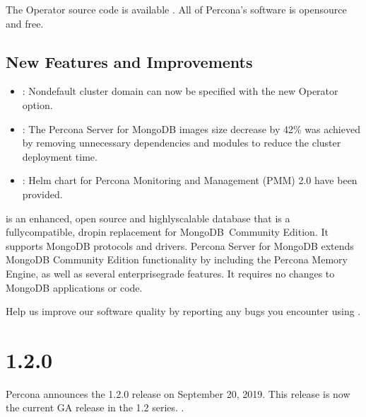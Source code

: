 \documentclass[letterpaper,10pt,english]{sphinxmanual}
\begin{document}
The Operator source code is available .
All of Percona’s software is open\sphinxhyphen{}source and free.


\subsection{New Features and Improvements}
\label{\detokenize{RN/Kubernetes-Operator-for-PSMONGODB-RN1.3.0:new-features-and-improvements}}\begin{itemize}
\item {} 
: Non\sphinxhyphen{}default cluster domain can now be specified with the new
 Operator option.

\item {} 
: The Percona Server for MongoDB images size decrease by 42\%
was achieved by removing unnecessary dependencies and modules to reduce the
cluster deployment time.

\item {} 
: Helm chart for Percona Monitoring and Management (PMM) 2.0
have been provided.

\end{itemize}

is an enhanced, open source and highly\sphinxhyphen{}scalable database that is a
fully\sphinxhyphen{}compatible, drop\sphinxhyphen{}in replacement for MongoDB Community Edition. It supports
MongoDB protocols and drivers. Percona Server for MongoDB extends MongoDB
Community Edition functionality by including the Percona Memory Engine, as well
as several enterprise\sphinxhyphen{}grade features. It requires no changes to MongoDB
applications or code.

Help us improve our software quality by reporting any bugs you encounter using
.


\section{ 1.2.0}
\label{\detokenize{RN/Kubernetes-Operator-for-PSMONGODB-RN1.2.0:percona-kubernetes-operator-for-percona-server-for-mongodb-1-2-0}}\label{\detokenize{RN/Kubernetes-Operator-for-PSMONGODB-RN1.2.0::doc}}
Percona announces the  1.2.0 release on September 20, 2019. This release is now the current
GA release in the 1.2 series. .
\end{document}
